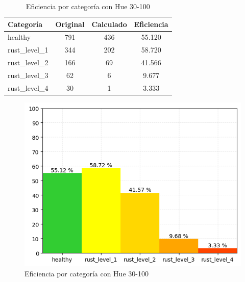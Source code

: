 \captionsetup[figure]{skip=10pt}

\begin{table}[H]
\centering
\begin{tabular}{|l|c|c|c|}
\hline 
\textbf{Categoría} & \textbf{Original} & \textbf{Calculado} & \textbf{Eficiencia} \\
\hline
healthy & 791 & 436 & 55.120 \\
\hline 
rust\_level\_1 & 344 & 202 & 58.720 \\
\hline 
rust\_level\_2 & 166 & 69 & 41.566 \\
\hline 
rust\_level\_3 & 62 & 6 & 9.677 \\
\hline 
rust\_level\_4 & 30 & 1 & 3.333 \\
\hline 
\end{tabular}
\caption{Eficiencia por categoría con Hue 30-100}
\label{table:efficiency_categories_30_100}
\end{table}

\begin{figure}[H]
\centering
\includegraphics[scale=0.6]{images/result_classes_30_100.png}
\caption{Eficiencia por categoría con Hue 30-100}
\label{img:efficiency_categories_30_100}
\end{figure}

